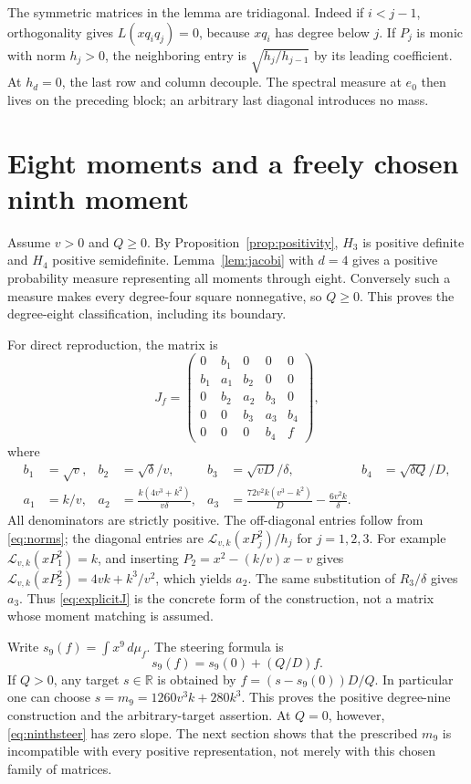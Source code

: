\documentclass[11pt]{article}
\newcommand{\R}{\mathbb R}
\newcommand{\Lk}{\mathcal L_{v,k}}
\begin{document}
The symmetric matrices in the lemma are tridiagonal.
Indeed if $i<j-1$, orthogonality gives
$L(xq_iq_j)=0$, because $xq_i$ has degree below $j$.
If $P_j$ is monic with norm $h_j>0$, the neighboring
entry is $\sqrt{h_j/h_{j-1}}$ by its leading coefficient.
At $h_d=0$, the last row and column decouple. The
spectral measure at $e_0$ then lives on the preceding
block; an arbitrary last diagonal introduces no mass.

\section{Eight moments and a freely chosen ninth moment}
Assume $v>0$ and $Q\geq0$. By
Proposition~\ref{prop:positivity}, $H_3$ is positive
definite and $H_4$ positive semidefinite.
Lemma~\ref{lem:jacobi} with $d=4$ gives a positive
probability measure representing all moments through eight.
Conversely such a measure makes every degree-four square
nonnegative, so $Q\geq0$. This proves the degree-eight
classification, including its boundary.

For direct reproduction, the matrix is
\begin{equation}\label{eq:explicitJ}
 J_f=\begin{pmatrix}
 0&b_1&0&0&0\\
 b_1&a_1&b_2&0&0\\
 0&b_2&a_2&b_3&0\\
 0&0&b_3&a_3&b_4\\
 0&0&0&b_4&f
 \end{pmatrix},
\end{equation}
where
\begin{align}
 b_1&=\sqrt v,& b_2&=\sqrt\delta/v,&
 b_3&=\sqrt{vD}/\delta,& b_4&=\sqrt{\delta Q}/D,\label{eq:offdiag}\\
 a_1&=k/v,&
 a_2&=\frac{k(4v^3+k^2)}{v\delta},&
 a_3&=\frac{72v^2k(v^3-k^2)}D-\frac{6v^2k}\delta.\label{eq:diag}
\end{align}
All denominators are strictly positive. The off-diagonal
entries follow from \eqref{eq:norms}; the diagonal entries
are $\Lk(xP_j^2)/h_j$ for $j=1,2,3$.
For example $\Lk(xP_1^2)=k$, and inserting
$P_2=x^2-(k/v)x-v$ gives
$\Lk(xP_2^2)=4vk+k^3/v^2$, which yields $a_2$.
The same substitution of $R_3/\delta$ gives $a_3$.
Thus \eqref{eq:explicitJ} is the concrete form of the
construction, not a matrix whose moment matching is assumed.

Write $s_9(f)=\int x^9\,d\mu_f$. The steering formula is
\begin{equation}\label{eq:ninthsteer}
 s_9(f)=s_9(0)+(Q/D)f.
\end{equation}
If $Q>0$, any target $s\in\R$ is obtained by
$f=(s-s_9(0))D/Q$. In particular one can choose
$s=m_9=1260v^3k+280k^3$. This proves the positive
degree-nine construction and the arbitrary-target assertion.
At $Q=0$, however, \eqref{eq:ninthsteer} has zero slope.
The next section shows that the prescribed $m_9$ is
incompatible with every positive representation, not
merely with this chosen family of matrices.
\end{document}
